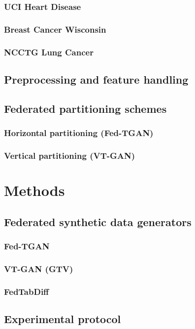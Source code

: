 \documentclass{article}
\begin{document}
\subsubsection{UCI Heart Disease}
\subsubsection{Breast Cancer Wisconsin}
\subsubsection{NCCTG Lung Cancer}

\subsection{Preprocessing and feature handling}

\subsection{Federated partitioning schemes}
\subsubsection{Horizontal partitioning (Fed-TGAN)}
\subsubsection{Vertical partitioning (VT-GAN)}

\section{Methods}

\subsection{Federated synthetic data generators}
\subsubsection{Fed-TGAN}
\subsubsection{VT-GAN (GTV)}
\subsubsection{FedTabDiff}

\subsection{Experimental protocol}
\end{document}
